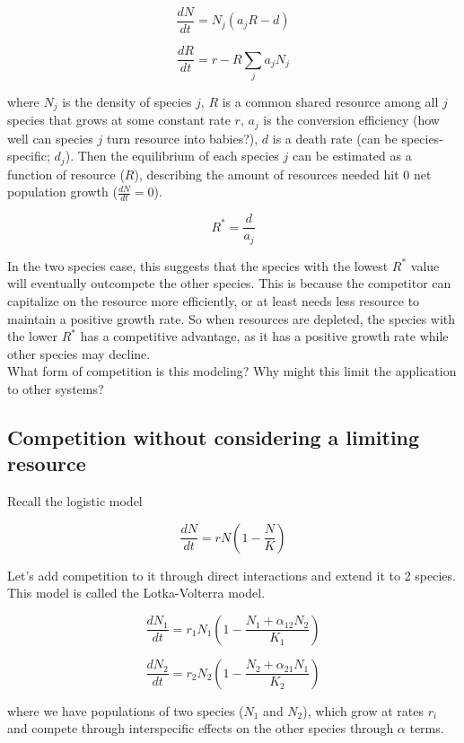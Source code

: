 \documentclass[12pt]{article}
\begin{document}
\[\frac{dN}{dt} = N_{j}(a_{j}R - d) \]

\[\frac{dR}{dt} = r - R\sum_{j} a_{j}N_{j} \]

where $N_{j}$ is the density of species $j$, $R$ is a common shared resource among all $j$ species that grows at some constant rate $r$, $a_{j}$ is the conversion efficiency (how well can species $j$ turn resource into babies?), $d$ is a death rate (can be species-specific; $d_{j}$). Then the equilibrium of each species $j$ can be estimated as a function of resource ($R$), describing the amount of resources needed hit 0 net population growth ($\frac{dN}{dt} = 0$). 

\[ R^{*} = \frac{d}{a_{j}} \]

In the two species case, this suggests that the species with the lowest $R^{*}$ value will eventually outcompete the other species. This is because the competitor can capitalize on the resource more efficiently, or at least needs less resource to maintain a positive growth rate. So when resources are depleted, the species with the lower $R^{*}$ has a competitive advantage, as it has a positive growth rate while other species may decline. \\

What form of competition is this modeling? Why might this limit the application to other systems?












\subsection*{Competition without considering a limiting resource}

Recall the logistic model 

\[ \frac{dN}{dt} = rN\left(1-\frac{N}{K} \right) \]


Let's add competition to it through direct interactions and extend it to 2 species. This model is called the Lotka-Volterra model.

\[ \frac{dN_{1}}{dt} = r_{1}N_{1}\left(1-\frac{N_{1} + \alpha_{12}N_{2}}{K_{1}} \right) \]

\[ \frac{dN_{2}}{dt} = r_{2}N_{2}\left(1-\frac{N_{2} + \alpha_{21}N_{1}}{K_{2}} \right) \]


where we have populations of two species ($N_{1}$ and $N_{2}$), which grow at rates $r_{i}$ and compete through interspecific effects on the other species through $\alpha$ terms. 
\end{document}
